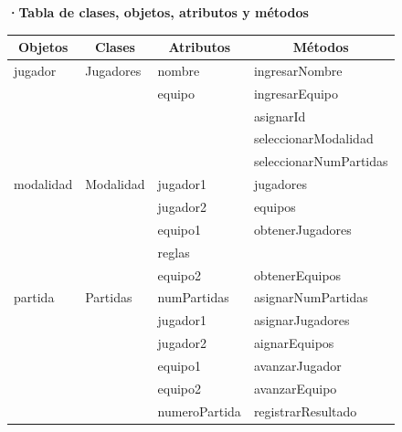 \documentclass[12pt]{article}
\begin{document}
\textbf{·Tabla de clases, objetos, atributos y métodos}

\begin{table}[H]
\begin{tabular}{|l|l|l|l|}
\hline
\multicolumn{1}{|c|}{\textbf{Objetos}} & \multicolumn{1}{c|}{\textbf{Clases}} & \multicolumn{1}{c|}{\textbf{Atributos}} & \multicolumn{1}{c|}{\textbf{Métodos}} \\
\hline 

jugador      & Jugadores    & nombre                                        & ingresarNombre \\ 
             &              & equipo                                        & ingresarEquipo \\
             &              &                                               & asignarId \\ 
             &              &                                               & seleccionarModalidad\\ 
             &              &                                               & seleccionarNumPartidas \\ \hline
modalidad    & Modalidad    & jugador1                                      & jugadores \\
             &              & jugador2                                      & equipos \\
             &              & equipo1                                       & obtenerJugadores\\
             &              & reglas                                        & \\
             &              & equipo2                                       & obtenerEquipos\\ \hline
partida      & Partidas     & numPartidas                                   & asignarNumPartidas \\
             &              & jugador1                                      & asignarJugadores \\  
             &              & jugador2                                      & aignarEquipos \\
             &              & equipo1                                       & avanzarJugador \\
             &              & equipo2                                       & avanzarEquipo \\
             &              & numeroPartida                                 & registrarResultado \\

\end{tabular}
\end{table}
\end{document}
